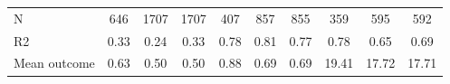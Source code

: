\begin{tabular}{lccc|ccc|ccc}
N           &         646         &        1707         &        1707         &         407         &         857         &         855         &         359         &         595         &         592         \\
R2          &        0.33         &        0.24         &        0.33         &        0.78         &        0.81         &        0.77         &        0.78         &        0.65         &        0.69         \\
Mean outcome&        0.63         &        0.50         &        0.50         &        0.88         &        0.69         &        0.69         &       19.41         &       17.72         &       17.71         \\
\bottomrule \end{tabular}
